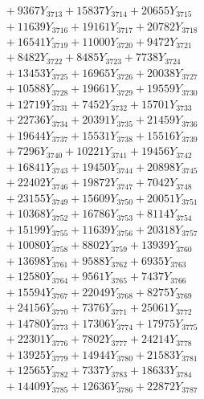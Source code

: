 \documentclass[a4paper,10pt]{article}
\begin{document}
{\begin{align}
&\;  + 9367 Y_{3713} + 15837 Y_{3714} + 20655 Y_{3715} \\[0.3ex]
&\;  + 11639 Y_{3716} + 19161 Y_{3717} + 20782 Y_{3718} \\[0.5ex]\allowbreak
&\;  + 16541 Y_{3719} + 11000 Y_{3720} + 9472 Y_{3721} \\[0.3ex]
&\;  + 8482 Y_{3722} + 8485 Y_{3723} + 7738 Y_{3724} \\[0.3ex]
&\;  + 13453 Y_{3725} + 16965 Y_{3726} + 20038 Y_{3727} \\[0.3ex]
&\;  + 10588 Y_{3728} + 19661 Y_{3729} + 19559 Y_{3730} \\[0.3ex]
&\;  + 12719 Y_{3731} + 7452 Y_{3732} + 15701 Y_{3733} \\[0.3ex]
&\;  + 22736 Y_{3734} + 20391 Y_{3735} + 21459 Y_{3736} \\[0.3ex]
&\;  + 19644 Y_{3737} + 15531 Y_{3738} + 15516 Y_{3739} \\[0.3ex]
&\;  + 7296 Y_{3740} + 10221 Y_{3741} + 19456 Y_{3742} \\[0.3ex]
&\;  + 16841 Y_{3743} + 19450 Y_{3744} + 20898 Y_{3745} \\[0.3ex]
&\;  + 22402 Y_{3746} + 19872 Y_{3747} + 7042 Y_{3748} \\[0.5ex]\allowbreak
&\;  + 23155 Y_{3749} + 15609 Y_{3750} + 20051 Y_{3751} \\[0.3ex]
&\;  + 10368 Y_{3752} + 16786 Y_{3753} + 8114 Y_{3754} \\[0.3ex]
&\;  + 15199 Y_{3755} + 11639 Y_{3756} + 20318 Y_{3757} \\[0.3ex]
&\;  + 10080 Y_{3758} + 8802 Y_{3759} + 13939 Y_{3760} \\[0.3ex]
&\;  + 13698 Y_{3761} + 9588 Y_{3762} + 6935 Y_{3763} \\[0.3ex]
&\;  + 12580 Y_{3764} + 9561 Y_{3765} + 7437 Y_{3766} \\[0.3ex]
&\;  + 15594 Y_{3767} + 22049 Y_{3768} + 8275 Y_{3769} \\[0.3ex]
&\;  + 24156 Y_{3770} + 7376 Y_{3771} + 25061 Y_{3772} \\[0.3ex]
&\;  + 14780 Y_{3773} + 17306 Y_{3774} + 17975 Y_{3775} \\[0.3ex]
&\;  + 22301 Y_{3776} + 7802 Y_{3777} + 24214 Y_{3778} \\[0.5ex]\allowbreak
&\;  + 13925 Y_{3779} + 14944 Y_{3780} + 21583 Y_{3781} \\[0.3ex]
&\;  + 12565 Y_{3782} + 7337 Y_{3783} + 18633 Y_{3784} \\[0.3ex]
&\;  + 14409 Y_{3785} + 12636 Y_{3786} + 22872 Y_{3787} \\[0.3ex]

\end{align}}
\end{document}
